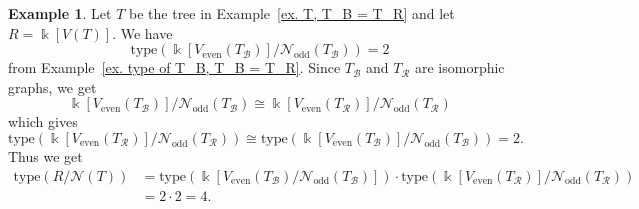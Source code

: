 \documentclass[12pt, reqno]{amsart}
\theoremstyle{definition}
\theoremstyle{plain}
\theoremstyle{definition}
\newtheorem{example}[theorem]{Example}
\newcommand{\tp}{\mbox{type}}
\newcommand{\R}{\mathcal{R}}
\newcommand{\B}{\mathcal{B}}
\newcommand{\kk}{\Bbbk}
\newcommand{\NN}{\mathcal{N}}
\begin{document}
\begin{example}
    Let $T$ be the tree in Example~\ref{ex. T, T_B = T_R} and let $R = \kk[V(T)]$.
    We have 
    $$
    \tp(\kk[V_{\text{even}}(T_\B)]/\NN_{\text{odd}}(T_\B)) = 2
    $$ 
    from Example~\ref{ex. type of T_B, T_B = T_R}.
    Since $T_\B$ and $T_\R$ are isomorphic graphs, we get
    $$
    \kk[V_{\text{even}}(T_\B)]/\NN_{\text{odd}}(T_\B) \cong \kk[V_{\text{even}}(T_\R)]/\NN_{\text{odd}}(T_\R)
    $$
    which gives
    $$
    \tp(\kk[V_{\text{even}}(T_\R)]/\NN_{\text{odd}}(T_\R)) \cong  \tp(\kk[V_{\text{even}}(T_\B)]/\NN_{\text{odd}}(T_\B)) = 2.
    $$
    Thus we get
    \begin{align*}
        \tp(R/\NN(T)) &= \tp(\kk[V_{\text{even}}(T_\B)/\NN_{\text{odd}}(T_\B)]) \cdot \tp(\kk[V_{\text{even}}(T_\R)]/\NN_{\text{odd}}(T_\R))\\ 
        &= 2 \cdot 2 = 4.
    \end{align*}
\end{example}

%
%

\printbibliography
\end{document}
